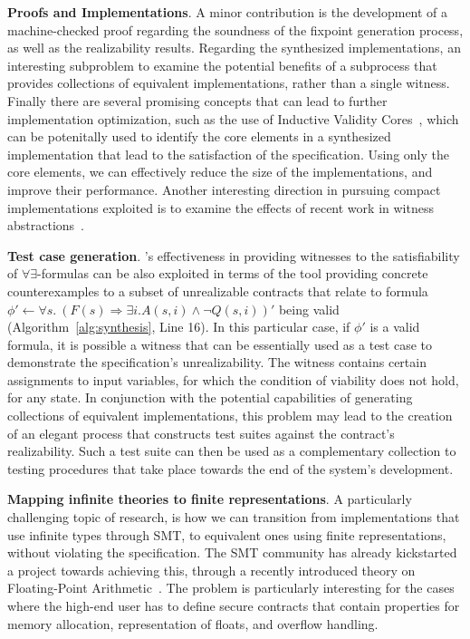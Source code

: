 \textbf{Proofs and Implementations}. A minor contribution is the development of a  machine-checked
proof regarding the soundness of the fixpoint generation process, as well as the realizability results.
Regarding the synthesized implementations, an interesting subproblem to examine the potential benefits of a subprocess that provides collections of equivalent implementations, rather than
a single witness. Finally there are several promising concepts that can lead to further implementation optimization, such as the use of Inductive Validity Cores~\cite{Ghass16}, which can be potenitally used to identify the core elements in a synthesized implementation that lead to the satisfaction of the specification. Using only the core elements, we can effectively reduce the size of the implementations, and improve their performance. Another interesting direction in pursuing compact implementations exploited is to examine the effects of recent work in witness abstractions~\cite{jakobs2017compact}. 

\textbf{Test case generation}. \aeval's effectiveness in providing witnesses to the
satisfiability of $\forall\exists$-formulas can be also exploited in terms of the
tool providing concrete counterexamples to a subset of unrealizable contracts that relate to formula $\phi' \gets \forall s. \ (F(s) \Rightarrow \exists i. A(s,i) \land \lnot Q(s,i))'$ being valid (Algorithm~\ref{alg:synthesis}, Line 16). 
In this particular case, if $\phi'$ is a valid formula, it is possible a witness that can be essentially used as a test case to demonstrate the specification's unrealizability. The witness contains
certain assignments to input variables, for which the condition of viability does not hold, for any state. In conjunction with the potential capabilities of generating collections of equivalent implementations, this problem may lead to the creation of an elegant process that constructs test suites against the contract's realizability. Such a test suite can then be used as a complementary collection to testing procedures that take place towards the end of the system's development.    

\textbf{Mapping infinite theories to finite representations}. A particularly challenging topic of research, is how we can transition from implementations that use
infinite types through SMT, to equivalent ones using finite representations, without violating the specification. The SMT community has already kickstarted a project towards achieving this, through a recently introduced theory on Floating-Point Arithmetic~\cite{brain2015automatable}. The problem is particularly interesting for the cases where the high-end user has to define secure contracts that contain properties for memory allocation, representation of floats, and overflow handling.


